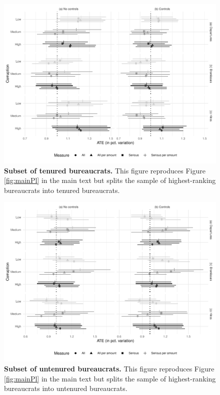 {\begin{figure}[H]
    \centering
    \includegraphics{chapters/chapter_2/figures/plSubsetTenured}
    \caption{{\bf Subset of tenured bureaucrats.} This figure reproduces Figure \ref{fig:mainPl} in the main text but splits the sample of highest-ranking bureaucrats into tenured bureaucrats.}
    \label{fig:plSubsetTenured}
\end{figure}

\begin{figure}[H]
    \centering
    \includegraphics{chapters/chapter_2/figures/plSubsetUntenured}
    \caption{{\bf Subset of untenured bureaucrats.} This figure reproduces Figure \ref{fig:mainPl} in the main text but splits the sample of highest-ranking bureaucrats into untenured bureaucrats.}
    \label{fig:plSubsetUntenured}
\end{figure}

}
